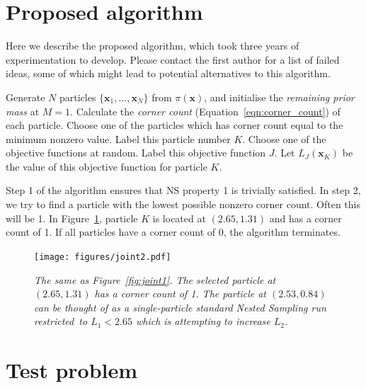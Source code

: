 \documentclass[journal,article,accept,moreauthors,pdftex,12pt,a4paper]{mdpi}
\newcommand{\xx}{\boldsymbol{x}}
\begin{document}
\section{Proposed algorithm}\label{sec:algorithm}

Here we describe the proposed algorithm, which took three years of
experimentation to develop. Please contact the first author for a list of
failed ideas, some of which might lead to potential alternatives to this
algorithm. 

\begin{algorithm}
\begin{algorithmic}
\State Generate $N$ particles $\{\xx_1, ..., \xx_N\}$ from $\pi(\xx)$, and
initialise the {\em remaining prior mass} at $M=1$.
	\State Calculate the {\it corner count} (Equation~\ref{eqn:corner_count})
of each particle.
	\State Choose one of the particles which has corner count equal to the
minimum nonzero value. Label this particle number $K$.
	\State Choose one of the objective functions at random. Label this
objective function $J$. Let $L_{J}(\xx_K)$ be the value of this objective
function for particle $K$.
\EndWhile
\end{algorithmic}
\end{algorithm}

Step 1 of the algorithm ensures that NS property 1 is trivially satisfied.
In step 2, we try to find a particle with the lowest possible nonzero
corner count. Often this will be 1. In Figure~\ref{fig:joint2}, particle $K$
is located at $(2.65, 1.31)$ and has a corner count of 1.
If all particles have a corner count of 0, the algorithm terminates.



\begin{figure}
\centering
\texttt{[image: figures/joint2.pdf]}
\caption{\it The same as Figure~\ref{fig:joint1}. The selected particle
at $(2.65, 1.31)$ has a corner count of 1. The particle at
$(2.53, 0.84)$ can be thought of as a single-particle standard Nested Sampling
run restricted to $L_1 < 2.65$ which is attempting to increase $L_2$.
\label{fig:joint2}}
\end{figure}




\section{Test problem}
\end{document}
